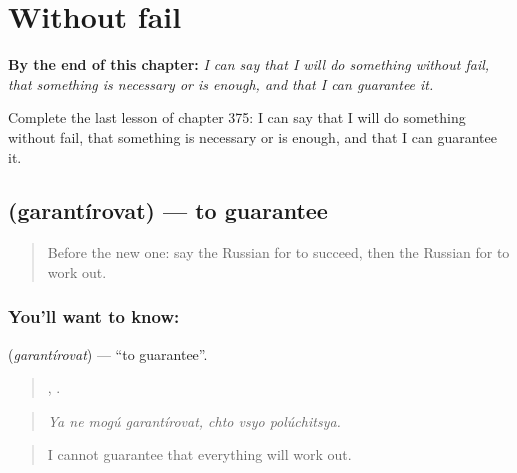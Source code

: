 
\chapter{Without fail}
\label{ch:ru-without-fail}

\begin{chapteropening}
\textbf{By the end of this chapter:} \emph{I can say that I will do something without fail, that something is necessary or is enough, and that I can guarantee it.}

Complete the last lesson of chapter 375: I can say that I will do something without fail, that something is necessary or is enough, and that I can guarantee it.
\end{chapteropening}

\section[\texorpdfstring{\ru{гарантировать} (garantírovat)}{гарантировать (garantírovat)}]{ (garantírovat) — to guarantee}

\label{lesson:RU-C375-garantirovat}



\begin{quote}
Before the new one: say the Russian for to succeed, then the Russian for to work out.
\end{quote}

\subsection*{You'll want to know: }
\textbf{} (\emph{garantírovat}) — \textquotedblleft{}to guarantee\textquotedblright{}.

\begin{quote}
   ,   .
\end{quote}

\begin{quote}
\emph{Ya ne mogú garantírovat, chto vsyo polúchitsya.}
\end{quote}

\begin{quote}
I cannot guarantee that everything will work out.
\end{quote}


